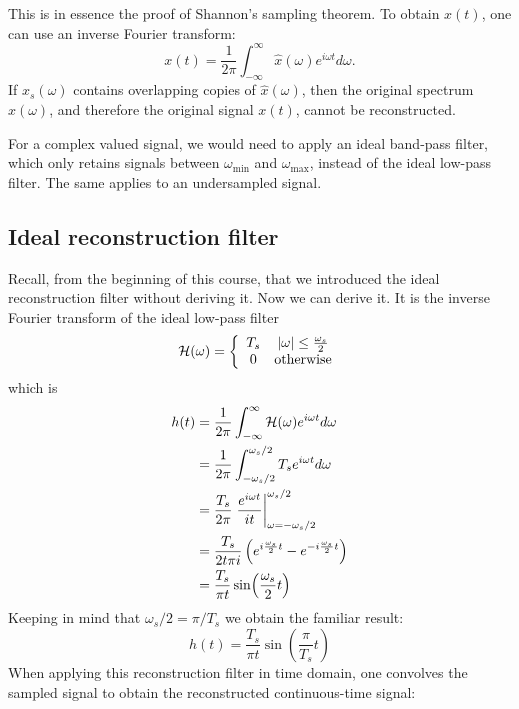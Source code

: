 This is in essence the proof of Shannon's sampling theorem. To obtain $x(t)$, one can use an inverse Fourier transform:
\begin{equation}
x(t) = \frac{1}{2\pi}\int_{-\infty}^{\infty} \hat{x}(\omega) e^{i\omega t}d\omega.
\end{equation}
If $\hat{x}_s(\omega)$ contains overlapping copies of $\hat{x}(\omega)$, then the original spectrum $\hat{x}(\omega)$, and therefore the original signal $x(t)$, cannot be reconstructed.

For a complex valued signal, we would need to apply an ideal band-pass filter, which only retains signals between $\omega_{\mathrm{min}}$ and
$\omega_{\mathrm{max}}$, instead of the ideal low-pass filter. The same applies to an undersampled signal.

\subsection{Ideal reconstruction filter}
Recall, from the beginning of this course, that we introduced the ideal reconstruction filter without deriving it. Now we can derive it. It is the inverse Fourier transform of the ideal low-pass filter
\begin{equation}
\mathcal{H}(\omega) = \left\{ \begin{array}{cc}
T_s & |\omega| \le \frac{\omega_s}{2} \\
0 & \mathrm{otherwise}
\end{array}
\right.
\end{equation}
which is
\begin{align}
h(t) &= \frac{1}{2\pi}\int_{-\infty}^{\infty} \mathcal{H}(\omega) e^{i\omega t}d\omega \\
 &= \frac{1}{2\pi} \int_{-\omega_s/2}^{\omega_s/2} T_s e^{i\omega t}d\omega \\
 &= \frac{T_s}{2 \pi}\left. \frac{e^{i\omega t}}{it} \right|_{\omega=-\omega_s/2}^{\omega_s/2} \\
  &= \frac{T_s}{2 t \pi i}\left( e^{i\frac{\omega_s}{2} t}  - e^{-i\frac{\omega_s}{2} t} \right) \\
  &= \frac{T_s}{\pi t} \sin(\frac{\omega_s}{2}t) \\
\end{align}
Keeping in mind that $\omega_s/2 = \pi/T_s$ we obtain the familiar result:
\begin{equation}
\boxed{
h(t) = \frac{T_s}{\pi t}\sin(\frac{\pi}{T_s}t)
}
\end{equation}
When applying this reconstruction filter in time domain, one convolves the sampled signal to obtain the reconstructed continuous-time signal:
